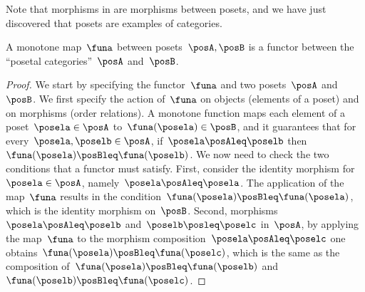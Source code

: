 
Note that morphisms in \Pos are morphisms between posets, and we have just discovered that posets are examples of categories.
\begin{lemma}
    \label{lem:posetfunctor}
    A monotone map~$\funa$ between posets~$\posA,\posB$ is a functor between the ``posetal categories''~$\posA$ and~$\posB$.
\end{lemma}
\begin{proof}
    We start by specifying the functor~$\funa$ and two posets~$\posA$ and~$\posB$.
    We first specify the action of~$\funa$ on objects (elements of a poset) and on morphisms (order relations).
    A monotone function maps each element of a poset~$\posela\in \posA$ to~$\funa(\posela) \in \posB$, and it guarantees that for every~$\posela,\poselb\in \posA$, if~$\posela\posAleq \poselb$ then~$\funa(\posela)\posBleq \funa(\poselb)$.
    We now need to check the two conditions that a functor must satisfy.
    First, consider the identity morphism for~$\posela\in \posA$, namely~$\posela \posAleq \posela$.
    The application of the map~$\funa$ results in the condition~$\funa(\posela)\posBleq \funa(\posela)$, which is the identity morphism on~$\posB$.
    Second, morphisms~$\posela\posAleq \poselb$ and~$\poselb\posleq \poselc$ in~$\posA$, by applying the map~$\funa$ to the morphism composition~$\posela\posAleq \poselc$ one obtains~$\funa(\posela)\posBleq \funa(\poselc)$, which is the same as the composition of~$\funa(\posela)\posBleq \funa(\poselb)$ and~$\funa(\poselb)\posBleq \funa(\poselc)$.
\end{proof}

